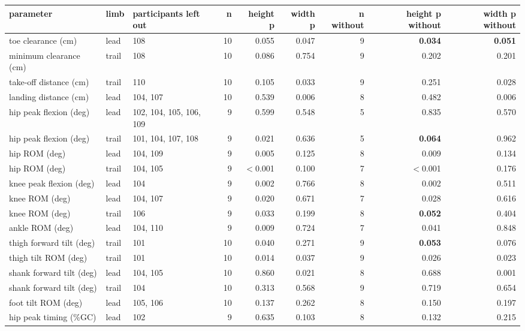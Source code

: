 \begin{adjustbox}{max width=\textwidth}
{\scriptsize
\begin{tabular}{llp{2.6cm}rrrrrr}
\toprule
\textbf{parameter} & \textbf{limb} & \textbf{participants left out} & \textbf{n} & \textbf{height p} & \textbf{width p} & \textbf{n without} & \textbf{height p without} & \textbf{width p without} \\
\midrule
toe clearance (cm) & lead & 108 & 10 & 0.055 & 0.047 & 9 & \textbf{0.034} & \textbf{0.051} \\
minimum clearance (cm) & trail & 108 & 10 & 0.086 & 0.754 & 9 & 0.202 & 0.201 \\
take-off distance (cm) & trail & 110 & 10 & 0.105 & 0.033 & 9 & 0.251 & 0.028 \\
landing distance (cm) & lead & 104, 107 & 10 & 0.539 & 0.006 & 8 & 0.482 & 0.006 \\
hip peak flexion (deg) & lead & 102, 104, 105, 106, 109 & 9 & 0.599 & 0.548 & 5 & 0.835 & 0.570 \\
hip peak flexion (deg) & trail & 101, 104, 107, 108 & 9 & 0.021 & 0.636 & 5 & \textbf{0.064} & 0.962 \\
hip ROM (deg) & lead & 104, 109 & 9 & 0.005 & 0.125 & 8 & 0.009 & 0.134 \\
hip ROM (deg) & trail & 104, 105 & 9 & $<$0.001 & 0.100 & 7 & $<$0.001 & 0.176 \\
knee peak flexion (deg) & lead & 104 & 9 & 0.002 & 0.766 & 8 & 0.002 & 0.511 \\
knee ROM (deg) & lead & 104, 107 & 9 & 0.020 & 0.671 & 7 & 0.028 & 0.616 \\
knee ROM (deg) & trail & 106 & 9 & 0.033 & 0.199 & 8 & \textbf{0.052} & 0.404 \\
ankle ROM (deg) & lead & 104, 110 & 9 & 0.009 & 0.724 & 7 & 0.041 & 0.848 \\
thigh forward tilt (deg) & trail & 101 & 10 & 0.040 & 0.271 & 9 & \textbf{0.053} & 0.076 \\
thigh tilt ROM (deg) & trail & 101 & 10 & 0.014 & 0.037 & 9 & 0.026 & 0.023 \\
shank forward tilt (deg) & lead & 104, 105 & 10 & 0.860 & 0.021 & 8 & 0.688 & 0.001 \\
shank forward tilt (deg) & trail & 104 & 10 & 0.313 & 0.568 & 9 & 0.719 & 0.654 \\
foot tilt ROM (deg) & lead & 105, 106 & 10 & 0.137 & 0.262 & 8 & 0.150 & 0.197 \\
hip peak timing (\%GC) & lead & 102 & 9 & 0.635 & 0.103 & 8 & 0.132 & 0.215 \\

\end{tabular}}
\end{adjustbox}

